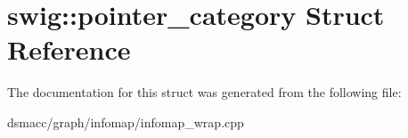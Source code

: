 \hypertarget{structswig_1_1pointer__category}{}\section{swig\+:\+:pointer\+\_\+category Struct Reference}
\label{structswig_1_1pointer__category}


The documentation for this struct was generated from the following file\+:\begin{DoxyCompactItemize}
\item 
dsmacc/graph/infomap/infomap\+\_\+wrap.\+cpp\end{DoxyCompactItemize}
